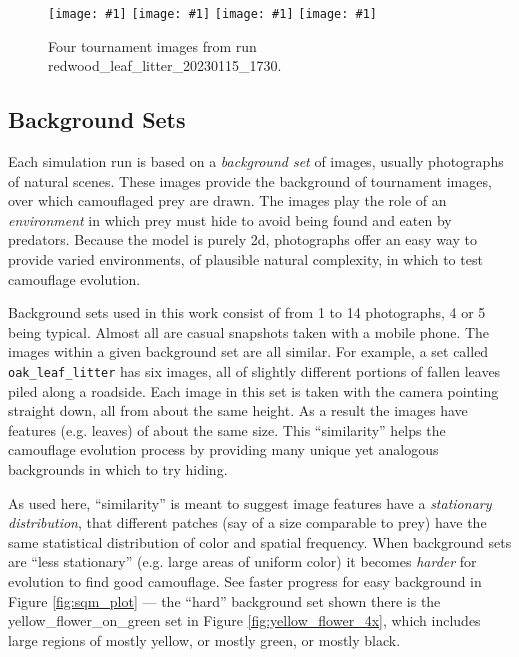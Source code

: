 \documentclass[letterpaper]{article}
\newcommand{\jargon}[1]{\textit{#1}}
\newcommand{\runID}{\footnotesize}
\newcommand{\igfour}[1]{\texttt{[image: \#1]}}
\newcommand{\stt}[1]{{\small \texttt{#1}}}
\begin{document}
\begin{figure}[t]
    \igfour{20230116_step_5868.png}
    \hfill
    \igfour{20230116_step_6057.png}
    \hfill
    \igfour{20230116_step_6347.png}
    \hfill
    \igfour{20230116_step_6814.png}
    \caption{Four tournament images from run {\runID redwood\_leaf\_litter\_20230115\_1730}.}
    \label{fig:redwood_leaf_litter_4x}
\end{figure}


\subsection{Background Sets}
\label{subsec:background_sets}
Each simulation run is based on a \jargon{background set} of images, usually photographs of natural scenes. These images provide the background of tournament images, over which camouflaged prey are drawn. The images play the role of an \jargon{environment} in which prey must hide to avoid being found and eaten by predators. Because the model is purely 2d, photographs offer an easy way to provide varied environments, of plausible natural complexity, in which to test camouflage evolution.
\par
Background sets used in this work consist of from 1 to 14 photographs, 4 or 5 being typical. Almost all are casual snapshots taken with a mobile phone. The images within a given background set are all similar. For example, a set called \stt{oak\_leaf\_litter} has six images, all of slightly different portions of fallen leaves piled along a roadside. Each image in this set is taken with the camera pointing straight down, all from about the same height. As a result the images have features (e.g. leaves) of about the same size. This ``similarity'' helps the camouflage evolution process by providing many unique yet analogous backgrounds in which to try hiding.
\par
As used here, ``similarity'' is meant to suggest image features have a \jargon{stationary distribution}, that different patches (say of a size comparable to prey) have the same statistical distribution of color and spatial frequency. When background sets are ``less stationary'' (e.g. large areas of uniform color) it becomes \jargon{harder} for evolution to find good camouflage. See faster progress for easy background in Figure \ref{fig:sqm_plot} — the ``hard'' background set shown there is the yellow\_flower\_on\_green set in Figure \ref{fig:yellow_flower_4x}, which includes large regions of mostly yellow, or mostly green, or mostly black.
\par
\end{document}
